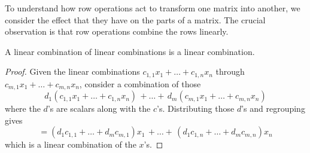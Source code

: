 To understand how row operations act to transform one matrix into another,
we consider the effect that they have on the parts of a matrix.
The crucial observation is that row operations combine the rows linearly.



\begin{lemma} 
A linear combination of linear combinations is a linear combination.
\end{lemma}

\begin{proof}
Given the linear combinations 
$c_{1,1}x_1+\dots+c_{1,n}x_n$ through $c_{m,1}x_1+\dots+c_{m,n}x_n$,
consider a combination of those
\begin{equation*}
  d_1(c_{1,1}x_1+\dots+c_{1,n}x_n)\,+\dots+\,d_m(c_{m,1}x_1+\dots+c_{m,n}x_n)
\end{equation*}
where the $d$'s are scalars along with the $c$'s.
Distributing those $d$'s and regrouping gives
\begin{equation*}
  =(d_1c_{1,1}+\dots+d_mc_{m,1})x_1\,+\dots+\,(d_1c_{1,n}+\dots+d_mc_{m,n})x_n
\end{equation*}
which is a linear combination of the $x$'s.
\end{proof}

